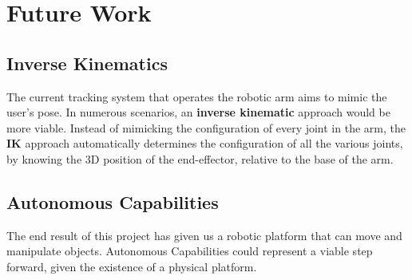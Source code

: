 \documentclass[12p,a4paper]{report}
\begin{document}
\section{Future Work}
\subsection{Inverse Kinematics}
The current tracking system that operates the robotic arm aims to mimic the user's pose. In numerous scenarios, an \textbf{inverse kinematic} approach would be more viable. Instead of mimicking the configuration of every joint in the arm, the \textbf{IK} approach automatically determines the configuration of all the various joints, by knowing the 3D position of the end-effector, relative to the base of the arm. 
\subsection{Autonomous Capabilities}
The end result of this project has given us a robotic platform that can move and manipulate objects. Autonomous Capabilities could represent a viable step forward, given the existence of a physical platform.
\end{document}
